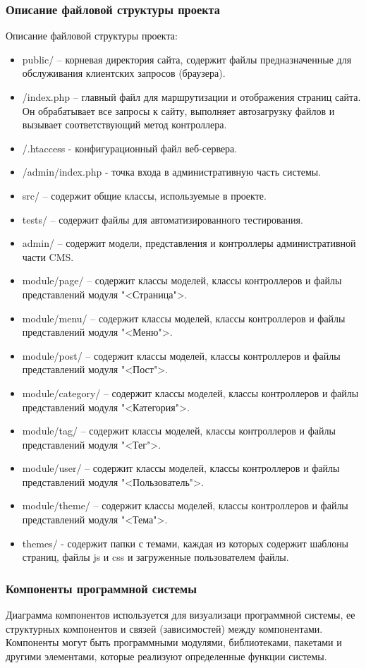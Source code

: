 \subsubsection{Описание файловой структуры проекта}
Описание файловой структуры проекта:
\begin{itemize}
	\item public/ -- корневая директория сайта, содержит файлы предназначенные для обслуживания клиентских запросов (браузера).
	\item /index.php -- главный файл для маршрутизации и отображения страниц сайта. Он обрабатывает все запросы к сайту, выполняет автозагрузку файлов и вызывает соответствующий метод контроллера.
	\item /.htaccess - конфигурационный файл веб-сервера.
	\item /admin/index.php - точка входа в административную часть системы.
	\item src/ -- содержит общие классы, используемые в проекте.
	\item tests/ -- содержит файлы для автоматизированного тестирования.
	\item admin/ -- содержит модели, представления и контроллеры административной части CMS.
	\item module/page/ -- содержит классы моделей, классы контроллеров и файлы представлений модуля "<Страница">.
	\item module/menu/ -- содержит классы моделей, классы контроллеров и файлы представлений модуля "<Меню">.
	\item module/post/ -- содержит классы моделей, классы контроллеров и файлы представлений модуля "<Пост">.
	\item module/category/ -- содержит классы моделей, классы контроллеров и файлы представлений модуля "<Категория">.
	\item module/tag/ -- содержит классы моделей, классы контроллеров и файлы представлений модуля "<Тег">.
	\item module/user/ -- содержит классы моделей, классы контроллеров и файлы представлений модуля "<Пользователь">.
	\item module/theme/ -- содержит классы моделей, классы контроллеров и файлы представлений модуля "<Тема">.
	\item themes/ - содержит папки с темами, каждая из которых содержит шаблоны страниц, файлы js и css и загруженные пользователем файлы.
\end{itemize}


\subsubsection{Компоненты программной системы}
Диаграмма компонентов используется для визуализаци программной системы, ее структурных компонентов и связей (зависимостей) между компонентами. Компоненты могут быть программными модулями, библиотеками, пакетами и другими элементами, которые реализуют определенные функции системы.

